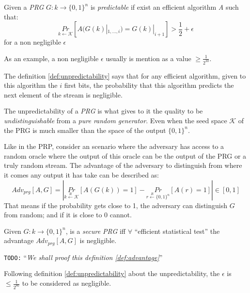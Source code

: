 \documentclass[10pt,a4paper,twoside]{llncs}
\newcommand{\todo}[1]{\texttt{\color{red}TODO:} ``\emph{#1}''}
\begin{document}
\begin{definition}\label{def:unpredictability}
 Given a \emph{PRG} $G: k \rightarrow \{0,1\}^n$ is \emph{predictable} if exist an efficient algorithm \emph{A} such that:
 \begin{equation}
  \underset{k\leftarrow\mathcal{K}}{Pr}\left[A(G(k)|_{1,...,i}) = G(k)|_{i+1}\right]>\frac{1}{2}
+\epsilon \end{equation}
 for a non negligible $\epsilon$
\end{definition}

As an example, a non negligible $\epsilon$ usually is mention as a value $\geqslant\frac{1}{2^{30}}$.

The definition \ref{def:unpredictability} says that for any efficient algorithm, given to this algorithm the $i$ first bits, the probability that this algorithm predicts the next element of the stream is negligible.

The unpredictability of a \emph{PRG} is what gives to it the quality to be \emph{undistinguishable} from a \emph{pure random generator}. Even when the seed space $\mathcal{K}$ of the PRG is much smaller than the space of the output $\{0,1\}^n$.

Like in the PRP, consider an scenario where the adversary has access to a random oracle where the output of this oracle can be the output of the PRG or a truly random stream. The advantage of the adversary to distinguish from where it comes any output it has take can be described as:
\begin{equation}\label{eq:prgAdv}
 {Adv}_{prg}[A,G] = \left|
                     \underset{k\overset{R}{\leftarrow}\mathcal{K}}{Pr}\left[A(G(k))=1\right]-
                     \underset{r\overset{R}{\leftarrow}\{0,1\}^n}{Pr}\left[A(r)=1\right]
                    \right|\in [0,1]
\end{equation}
That means if the probability gets close to 1, the adversary can distinguish $G$ from random; and if it is close to 0 cannot.

\begin{definition}\label{def:advantage}
 Given $G: k \rightarrow \{0,1\}^n$, is a \emph{secure PRG} iff $\forall$ ``efficient statistical test'' the advantage ${Adv}_{prg}[A,G]$ is negligible.
\end{definition}

\todo{We shall proof this definition \ref{def:advantage}}

Following definition \ref{def:unpredictability} about the unpredictability, the $\epsilon$ is $\leqslant\frac{1}{2^{80}}$ to be considered as negligible.
\end{document}
